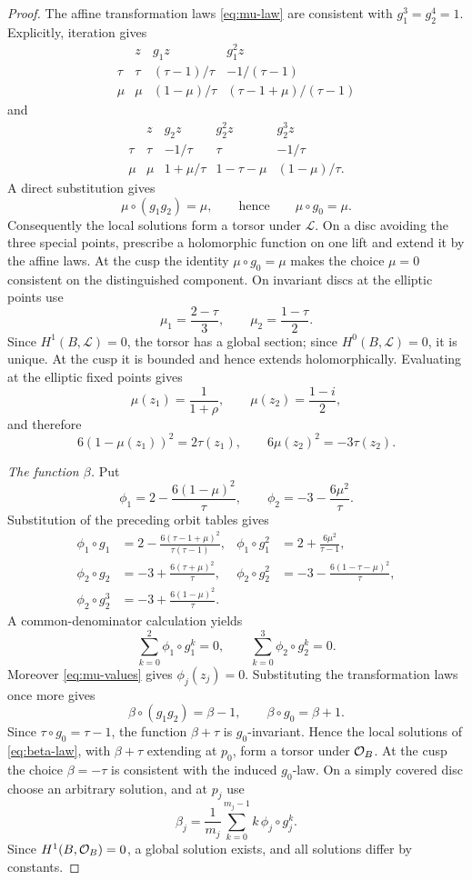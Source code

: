 \begin{proof}
The affine transformation laws \eqref{eq:mu-law} are consistent with
$g_1^3=g_2^4=1$.  Explicitly, iteration gives
\[
\begin{array}{c|ccc}
 &z&g_1z&g_1^2z\\ \hline
\tau&\tau&(\tau-1)/\tau&-1/(\tau-1)\\
\mu&\mu&(1-\mu)/\tau&(\tau-1+\mu)/(\tau-1)
\end{array}
\]
and
\[
\begin{array}{c|cccc}
 &z&g_2z&g_2^2z&g_2^3z\\ \hline
\tau&\tau&-1/\tau&\tau&-1/\tau\\
\mu&\mu&1+\mu/\tau&1-\tau-\mu&(1-\mu)/\tau.
\end{array}
\]
A direct substitution gives
\[
 \mu\circ(g_1g_2)=\mu,
 \qquad\text{hence}\qquad
 \mu\circ g_0=\mu.
\]
Consequently the local solutions form a torsor under $\mathcal L$.
On a disc avoiding the three special points, prescribe a holomorphic
function on one lift and extend it by the affine laws.  At the cusp the
identity $\mu\circ g_0=\mu$ makes the choice $\mu=0$ consistent on the
distinguished component.  On invariant discs at the elliptic points use
\[
 \mu_1=\frac{2-\tau}{3},
 \qquad
 \mu_2=\frac{1-\tau}{2}.
\]
Since $H^1(B,\mathcal L)=0$, the torsor has a global section; since
$H^0(B,\mathcal L)=0$, it is unique.  At the cusp it is bounded and hence
extends holomorphically.  Evaluating at the elliptic fixed points gives
\begin{equation}\label{eq:mu-values}
 \mu(z_1)=\frac1{1+\rho},
 \qquad
 \mu(z_2)=\frac{1-i}{2},
\end{equation}
and therefore
\[
 6(1-\mu(z_1))^2=2\tau(z_1),
 \qquad
 6\mu(z_2)^2=-3\tau(z_2).
\]

\smallskip
\noindent\emph{The function $\beta$.}
Put
\[
 \phi_1=2-\frac{6(1-\mu)^2}{\tau},
 \qquad
 \phi_2=-3-\frac{6\mu^2}{\tau}.
\]
Substitution of the preceding orbit tables gives
\begin{align*}
 \phi_1\circ g_1&=2-\frac{6(\tau-1+\mu)^2}{\tau(\tau-1)},
 &\phi_1\circ g_1^2&=2+\frac{6\mu^2}{\tau-1},\\
 \phi_2\circ g_2&=-3+\frac{6(\tau+\mu)^2}{\tau},
 &\phi_2\circ g_2^2&=-3-\frac{6(1-\tau-\mu)^2}{\tau},\\
 \phi_2\circ g_2^3&=-3+\frac{6(1-\mu)^2}{\tau}.
\end{align*}
A common-denominator calculation yields
\[
 \sum_{k=0}^2\phi_1\circ g_1^k=0,
 \qquad
 \sum_{k=0}^3\phi_2\circ g_2^k=0.
\]
Moreover \eqref{eq:mu-values} gives $\phi_j(z_j)=0$.  Substituting the
transformation laws once more gives
\[
 \beta\circ(g_1g_2)=\beta-1,
 \qquad
 \beta\circ g_0=\beta+1.
\]
Since $\tau\circ g_0=\tau-1$, the function $\beta+\tau$ is
$g_0$-invariant.  Hence the local solutions of \eqref{eq:beta-law}, with
$\beta+\tau$ extending at $p_0$, form a torsor under $\mathcal O_B$.  At the
cusp the choice $\beta=-\tau$ is consistent with the induced $g_0$-law.
On a simply covered disc choose an arbitrary solution, and at $p_j$ use
\[
 \beta_j=\frac1{m_j}\sum_{k=0}^{m_j-1}k\,\phi_j\circ g_j^k.
\]
Since $H^1(B,\mathcal O_B)=0$, a global solution exists, and all solutions differ
by constants.
\end{proof}

